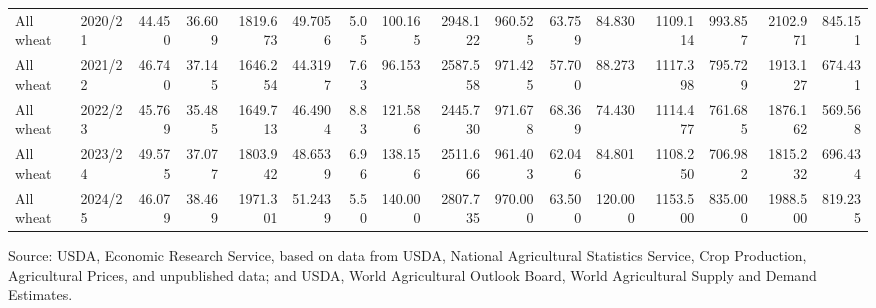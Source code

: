 \documentclass[12pt,a4paper]{article}%
\begin{document}
\begin{landscape}
\begin{table}[ht]
{\begin{tabular}{llrrrrrrrrrrrrrr}
All wheat & 2020/21 & 44.450 & 36.609 & 1819.673 & 49.7056 & 5.05 & 100.165 & 2948.122 & 960.525 & 63.759 & 84.830 & 1109.114 & 993.857 & 2102.971 & 845.151 \\
All wheat & 2021/22 & 46.740 & 37.145 & 1646.254 & 44.3197 & 7.63 & 96.153 & 2587.558 & 971.425 & 57.700 & 88.273 & 1117.398 & 795.729 & 1913.127 & 674.431 \\
All wheat & 2022/23 & 45.769 & 35.485 & 1649.713 & 46.4904 & 8.83 & 121.586 & 2445.730 & 971.678 & 68.369 & 74.430 & 1114.477 & 761.685 & 1876.162 & 569.568 \\
All wheat & 2023/24 & 49.575 & 37.077 & 1803.942 & 48.6539 & 6.96 & 138.156 & 2511.666 & 961.403 & 62.046 & 84.801 & 1108.250 & 706.982 & 1815.232 & 696.434 \\
All wheat & 2024/25 & 46.079 & 38.469 & 1971.301 & 51.2439 & 5.50 & 140.000 & 2807.735 & 970.000 & 63.500 & 120.000 & 1153.500 & 835.000 & 1988.500 & 819.235 \\
\bottomrule
\end{tabular}%
}
\raggedright

\vspace{0.3cm}
\footnotesize{Source: USDA, Economic Research Service, based on data from USDA, National Agricultural Statistics Service, Crop Production, Agricultural Prices, and unpublished data; and USDA, World Agricultural Outlook Board, World Agricultural Supply and Demand Estimates. }
\end{table}
\end{landscape}
\end{document}
